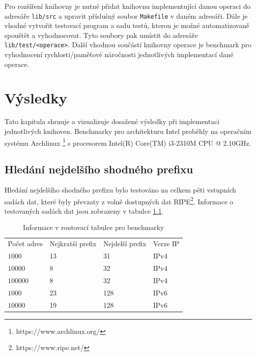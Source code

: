Pro rozšíření knihovny je nutné přidat knihovnu implementující danou operaci
do adresáře \texttt{lib/src} a upravit příslušný soubor \texttt{Makefile} v daném adresáři.
Dále je vhodné vytvořit testovací program a sadu testů, kterou je možné automatizovaně spouštět a vyhodnocovat.
Tyto soubory pak umístit do adresáře \texttt{lib/test/<operace>}.
Další vhodnou součástí knihovny operace je benchmark pro vyhodnocení rychlosti/paměťové náročnosti jednotlivých
implementací dané operace.



\chapter{Výsledky}\label{chapter:results} %
Tato kapitula shrnuje a vizualizuje dosažené výsledky při implementaci jednotlivých knihoven.
Benchmarky pro architekturu Intel proběhly na operačním systému Archlinux \footnote{https://www.archlinux.org/} s procesorem Intel(R) Core(TM) i3-2310M CPU @ 2.10GHz.

\section{Hledání nejdelšího shodného prefixu}\label{section:results-lpm} %

Hledání nejdelšího shodného prefixu bylo testováno na celkem pěti vstupních sadách dat, které
byly převzaty z volně dostupných dat RIPE\footnote{https://www.ripe.net/}.
Informace o testovaných sadách dat jsou zobrazeny v tabulce \ref{tab:lpm-input}.

\begin{table}[!htbp]
	\center
    \begin{tabular}{|l|l|l|l|}
    \hline
    Počet adres & Nejkratší prefix & Nejdelší prefix & Verze IP \\ \hhline{|=|=|=|=|}
    $1000$ & 13 & 31 & IPv4 \\ \hline
    $10000$ & 8 & 32 & IPv4 \\ \hline
    $100000$ & 8 & 32 & IPv4 \\ \hline
    $1000$ & 23 & 128 & IPv6 \\ \hline
    $10000$ & 19 & 128 & IPv6 \\ \hline
    \end{tabular}
	\caption{Informace v routovací tabulce pro benchmarky}
    \label{tab:lpm-input}
\end{table}


